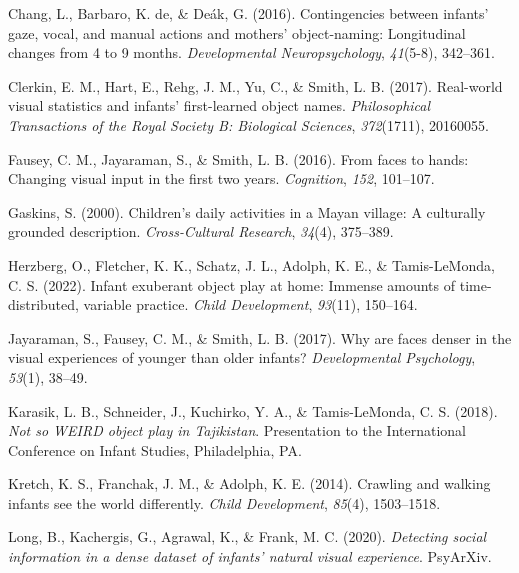 \documentclass[10pt, letterpaper]{article}
\newenvironment{CSLReferences}%
  {}%
  {\par}
\begin{document}
\begin{CSLReferences}{1}{0}
\leavevmode\hypertarget{ref-chang2016contingencies}{}%
Chang, L., Barbaro, K. de, \& Deák, G. (2016). Contingencies between
infants' gaze, vocal, and manual actions and mothers' object-naming:
Longitudinal changes from 4 to 9 months. \emph{Developmental
Neuropsychology}, \emph{41}(5-8), 342--361.

\leavevmode\hypertarget{ref-clerkin2017real}{}%
Clerkin, E. M., Hart, E., Rehg, J. M., Yu, C., \& Smith, L. B. (2017).
Real-world visual statistics and infants' first-learned object names.
\emph{Philosophical Transactions of the Royal Society B: Biological
Sciences}, \emph{372}(1711), 20160055.

\leavevmode\hypertarget{ref-fausey2016faces}{}%
Fausey, C. M., Jayaraman, S., \& Smith, L. B. (2016). From faces to
hands: Changing visual input in the first two years. \emph{Cognition},
\emph{152}, 101--107.

\leavevmode\hypertarget{ref-gaskins2000childrens}{}%
Gaskins, S. (2000). Children's daily activities in a {M}ayan village: A
culturally grounded description. \emph{Cross-Cultural Research},
\emph{34}(4), 375--389.

\leavevmode\hypertarget{ref-herzberg2022infant}{}%
Herzberg, O., Fletcher, K. K., Schatz, J. L., Adolph, K. E., \&
Tamis-LeMonda, C. S. (2022). Infant exuberant object play at home:
Immense amounts of time-distributed, variable practice. \emph{Child
Development}, \emph{93}(11), 150--164.

\leavevmode\hypertarget{ref-jayaraman2017faces}{}%
Jayaraman, S., Fausey, C. M., \& Smith, L. B. (2017). Why are faces
denser in the visual experiences of younger than older infants?
\emph{Developmental Psychology}, \emph{53}(1), 38--49.

\leavevmode\hypertarget{ref-karasik2018not}{}%
Karasik, L. B., Schneider, J., Kuchirko, Y. A., \& Tamis-LeMonda, C. S.
(2018). \emph{Not so {WEIRD} object play in {T}ajikistan}. {Presentation
to the International Conference on Infant Studies, Philadelphia, PA}.

\leavevmode\hypertarget{ref-kretch2014crawling}{}%
Kretch, K. S., Franchak, J. M., \& Adolph, K. E. (2014). Crawling and
walking infants see the world differently. \emph{Child Development},
\emph{85}(4), 1503--1518.

\leavevmode\hypertarget{ref-long2020detecting}{}%
Long, B., Kachergis, G., Agrawal, K., \& Frank, M. C. (2020).
\emph{Detecting social information in a dense dataset of infants'
natural visual experience}. PsyArXiv.


\end{CSLReferences}
\end{document}
